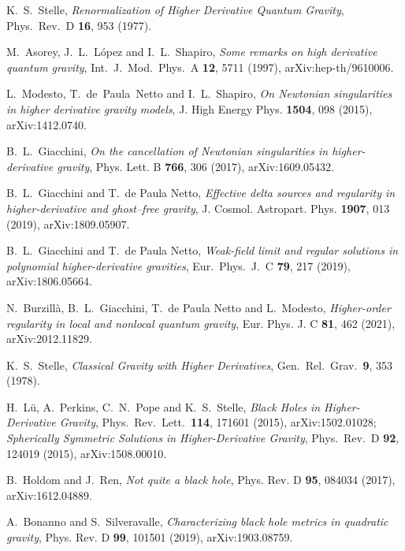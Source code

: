 \documentclass[aps,prd,a4paper,twocolumn,showpacs,showkeys,preprintnumbers,amsmath,amssymb,nofootinbib,usenames,dvipsnames]{revtex4-2}
\begin{document}
\begin{thebibliography}{99}

  K.~S.~Stelle,
{\it Renormalization of Higher Derivative Quantum Gravity},
Phys.\ Rev.\ D {\bf 16}, 953 (1977).

M.~Asorey, J.~L.~L\'opez and I.~L.~Shapiro,
{\it Some remarks on high derivative quantum gravity},
Int.\ J.\ Mod.\ Phys.\ A {\bf 12}, 5711 (1997), arXiv:hep-th/9610006.

L.~Modesto, T.~de~Paula~Netto and I.~L.~Shapiro,
{\it On Newtonian singularities in higher derivative gravity models},
J. High Energy Phys. {\bf 1504}, 098 (2015), 
arXiv:1412.0740.

B.~L.~Giacchini,
{\it On the cancellation of Newtonian singularities in higher-derivative gravity},
Phys. Lett. B {\bf 766}, 306 (2017), 
arXiv:1609.05432.

B.~L.~Giacchini and T.~de Paula Netto,
{\it Effective delta sources and regularity in higher-derivative and ghost--free gravity},
J. Cosmol. Astropart. Phys.  {\bf 1907}, 013 (2019),
arXiv:1809.05907.

B.~L.~Giacchini and T.~de Paula Netto,
{\it Weak-field limit and regular solutions in polynomial higher-derivative gravities},
Eur.\ Phys.\ J.\ C {\bf 79}, 217 (2019),
arXiv:1806.05664.

N.~Burzill\`a, B.~L.~Giacchini, T.~de Paula Netto and L.~Modesto,
{\it Higher-order regularity in local and nonlocal quantum gravity},
Eur. Phys. J. C \textbf{81}, 462 (2021),
arXiv:2012.11829.

K.~S.~Stelle,
{\it Classical Gravity with Higher Derivatives},
Gen.\ Rel.\ Grav.\  {\bf 9}, 353 (1978).

H.~L\"u, A.~Perkins, C.~N.~Pope and K.~S.~Stelle,
{\it Black Holes in Higher-Derivative Gravity},
Phys.\ Rev.\ Lett.\  {\bf 114}, 171601 (2015), arXiv:1502.01028;
{\it Spherically Symmetric Solutions in Higher-Derivative Gravity},
Phys.\ Rev.\ D {\bf 92}, 124019 (2015), arXiv:1508.00010.

B.~Holdom and J.~Ren,
{\it Not quite a black hole},
Phys. Rev. D \textbf{95}, 084034 (2017),
arXiv:1612.04889.

A.~Bonanno and S.~Silveravalle,
{\it Characterizing black hole metrics in quadratic gravity},
Phys. Rev. D \textbf{99}, 101501 (2019),
arXiv:1903.08759.


\end{thebibliography}
\end{document}
